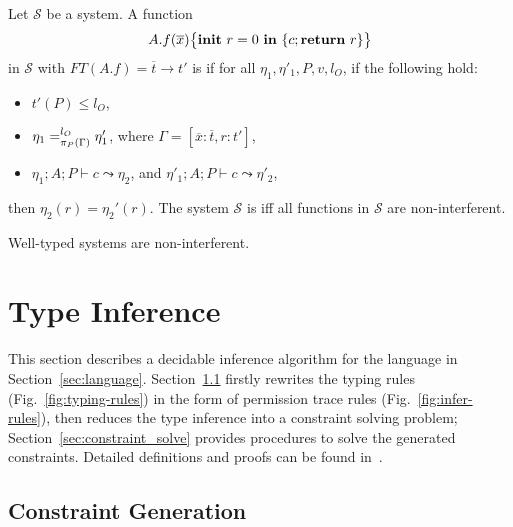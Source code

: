 {{{%

\begin{definition}\label{def:sys-ni}
Let $\mathcal{S}$ be a system.
A function
$${A.f}(\overline{x})\big\{{{\textbf{init}~ {r}=0 ~\textbf{in}~\{{c};\textbf{return}~{r}\}}}\big\}$$
in $\mathcal{S}$
with $FT(A.f) = \overline{t} \rightarrow t'$
is {}
if for all $\eta_1, \eta'_1, P, v, l_{O}$,
if the following hold:
\begin{itemize}
\item $t'(P) \leq l_{O}$,
\item $\eta_1 =_{\pi_{{P}}({\Gamma})}^{l_{O}} \eta'_1$, where
$\Gamma = [\overline{x} : \overline{t}, r : t']$,
\item $\eta_1;A ; P\vdash c \leadsto \eta_2 $, and $\eta'_1; A; P\vdash c\leadsto \eta'_2 $,
\end{itemize}
then $\eta_2(r) = \eta_2'(r).$
The system $\mathcal{S}$ is  iff all functions
in $\mathcal{S}$ are non-interferent.
\end{definition}

\begin{theorem}\label{thm:ni}
Well-typed systems are non-interferent.
\end{theorem}



 \section{Type Inference}\label{sec:constraint_gen}
This section describes a decidable inference algorithm for the language  in Section~\ref{sec:language}.
Section~\ref{sec:constraint-gen-rules} firstly rewrites the typing
rules (Fig.~\ref{fig:typing-rules}) in the form of permission trace
rules (Fig.~\ref{fig:infer-rules}), then reduces the type inference
into a constraint solving problem; Section~\ref{sec:constraint_solve}
provides procedures to solve the generated constraints. Detailed
definitions and proofs can be found in~\cite{Chen17arxiv}.


\subsection{Constraint Generation}\label{sec:constraint-gen-rules}
}}}

